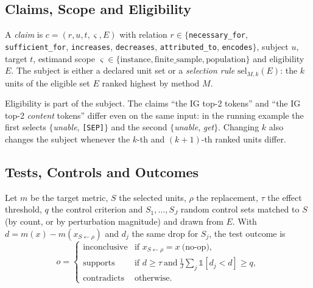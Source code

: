 \subsection{Claims, Scope and Eligibility}

\begin{definition}[Claim]
A \emph{claim} is $c=(r,u,t,\varsigma,E)$ with relation $r\in\{$\texttt{necessary\_for}, \texttt{sufficient\_for}, \texttt{increases}, \texttt{decreases}, \texttt{attributed\_to}, \texttt{encodes}$\}$, subject $u$, target $t$, estimand scope $\varsigma\in\{\text{instance},\text{finite\_sample},\text{population}\}$ and eligibility $E$. The subject is either a declared unit set or a \emph{selection rule} $\mathrm{sel}_{M,k}(E)$: the $k$ units of the eligible set $E$ ranked highest by method $M$.
\end{definition}

Eligibility is part of the subject. The claims ``the IG top-2 tokens'' and ``the IG top-2 \emph{content} tokens'' differ even on the same input: in the running example the first selects $\{$\textit{unable}, \texttt{[SEP]}$\}$ and the second $\{$\textit{unable}, \textit{get}$\}$. Changing $k$ also changes the subject whenever the $k$-th and $(k\!+\!1)$-th ranked units differ.

\subsection{Tests, Controls and Outcomes}

\begin{definition}
Let $m$ be the target metric, $S$ the selected units, $\rho$ the replacement, $\tau$ the effect threshold, $q$ the control criterion and $S_1,\dots,S_J$ random control sets matched to $S$ (by count, or by perturbation magnitude) and drawn from $E$. With $d=m(x)-m(x_{S\leftarrow\rho})$ and $d_j$ the same drop for $S_j$, the test outcome is
\begin{equation}
o=\begin{cases}
\text{inconclusive} & \text{if } x_{S\leftarrow\rho}=x \ \text{(no-op)},\\
\text{supports} & \text{if } d\ge\tau \ \text{and}\ \frac{1}{J}\sum_{j}\mathbb{1}[d_j<d]\ge q,\\
\text{contradicts} & \text{otherwise.}
\end{cases}
\label{eq:test}
\end{equation}
\end{definition}

